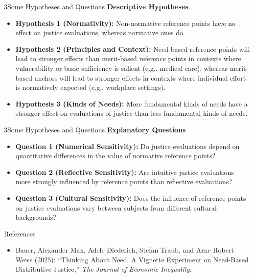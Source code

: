 \documentclass[xcolor=table,9pt,aspectratio=169]{beamer}
\begin{document}
\begin{frame}{\vspace*{10mm}3\hspace*{1em}Some Hypotheses and Questions}
   \textbf{Descriptive Hypotheses}
   
   \medskip
   \begin{itemize}
      \item \textbf{Hypothesis 1 (Normativity):} Non-normative reference points have no effect on justice evaluations, whereas normative ones do.
      \item \textbf{Hypothesis 2 (Principles and Context):} Need-based reference points will lead to stronger effects than merit-based reference points in contexts where vulnerability or basic sufficiency is salient (e.g., medical care), whereas merit-based anchors will lead to stronger effects in contexts where individual effort is normatively expected (e.g., workplace settings).
      \item \textbf{Hypothesis 3 (Kinds of Needs):} More fundamental kinds of needs have a stronger effect on evaluations of justice than less fundamental kinds of needs.
   \end{itemize}
\end{frame}


\begin{frame}{\vspace*{10mm}3\hspace*{1em}Some Hypotheses and Questions}
   \textbf{Explanatory Questions}
   
   \medskip
   \begin{itemize}
      \item \textbf{Question 1 (Numerical Sensitivity):} Do justice evaluations depend on quantitative differences in the value of normative reference points?
      \item \textbf{Question 2 (Reflective Sensitivity):} Are intuitive justice evaluations more strongly influenced by reference points than reflective evaluations?
      \item \textbf{Question 3 (Cultural Sensitivity):} Does the influence of reference points on justice evaluations vary between subjects from different cultural backgrounds?
   \end{itemize}
\end{frame}


\begin{frame}{\vspace*{10mm}References}
   \vspace*{-10mm}
   {\footnotesize
   \begin{itemize}[label=,leftmargin=2em,itemindent=-2em]
      \item Bauer, Alexander Max, Adele Diederich, Stefan Traub, and Arne Robert Weiss (2025): \enquote{Thinking About Need. A Vignette Experiment on Need-Based Distributive Justice,} \textit{The Journal of Economic Inequality}.
   \end{itemize}
   }
\end{frame}
\end{document}
